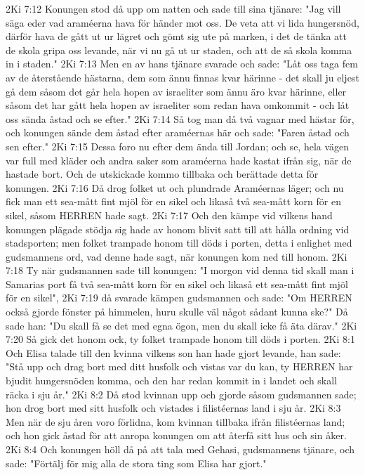 2Ki 7:12  Konungen stod då upp om natten och sade till sina tjänare: "Jag vill säga eder vad araméerna hava för händer mot oss. De veta att vi lida hungersnöd, därför hava de gått ut ur lägret och gömt sig ute på marken, i det de tänka att de skola gripa oss levande, när vi nu gå ut ur staden, och att de så skola komma in i staden."
2Ki 7:13  Men en av hans tjänare svarade och sade: "Låt oss taga fem av de återstående hästarna, dem som ännu finnas kvar härinne - det skall ju eljest gå dem såsom det går hela hopen av israeliter som ännu äro kvar härinne, eller såsom det har gått hela hopen av israeliter som redan hava omkommit - och låt oss sända åstad och se efter."
2Ki 7:14  Så tog man då två vagnar med hästar för, och konungen sände dem åstad efter araméernas här och sade: "Faren åstad och sen efter."
2Ki 7:15  Dessa foro nu efter dem ända till Jordan; och se, hela vägen var full med kläder och andra saker som araméerna hade kastat ifrån sig, när de hastade bort. Och de utskickade kommo tillbaka och berättade detta för konungen.
2Ki 7:16  Då drog folket ut och plundrade Araméernas läger; och nu fick man ett sea-mått fint mjöl för en sikel och likaså två sea-mått korn för en sikel, såsom HERREN hade sagt.
2Ki 7:17  Och den kämpe vid vilkens hand konungen plägade stödja sig hade av honom blivit satt till att hålla ordning vid stadsporten; men folket trampade honom till döds i porten, detta i enlighet med gudsmannens ord, vad denne hade sagt, när konungen kom ned till honom.
2Ki 7:18  Ty när gudsmannen sade till konungen: "I morgon vid denna tid skall man i Samarias port få två sea-mått korn för en sikel och likaså ett sea-mått fint mjöl för en sikel",
2Ki 7:19  då svarade kämpen gudsmannen och sade: "Om HERREN också gjorde fönster på himmelen, huru skulle väl något sådant kunna ske?" Då sade han: "Du skall få se det med egna ögon, men du skall icke få äta därav."
2Ki 7:20  Så gick det honom ock, ty folket trampade honom till döds i porten.
2Ki 8:1  Och Elisa talade till den kvinna vilkens son han hade gjort levande, han sade: "Stå upp och drag bort med ditt husfolk och vistas var du kan, ty HERREN har bjudit hungersnöden komma, och den har redan kommit in i landet och skall räcka i sju år."
2Ki 8:2  Då stod kvinnan upp och gjorde såsom gudsmannen sade; hon drog bort med sitt husfolk och vistades i filistéernas land i sju år.
2Ki 8:3  Men när de sju åren voro förlidna, kom kvinnan tillbaka ifrån filistéernas land; och hon gick åstad för att anropa konungen om att återfå sitt hus och sin åker.
2Ki 8:4  Och konungen höll då på att tala med Gehasi, gudsmannens tjänare, och sade: "Förtälj för mig alla de stora ting som Elisa har gjort."
